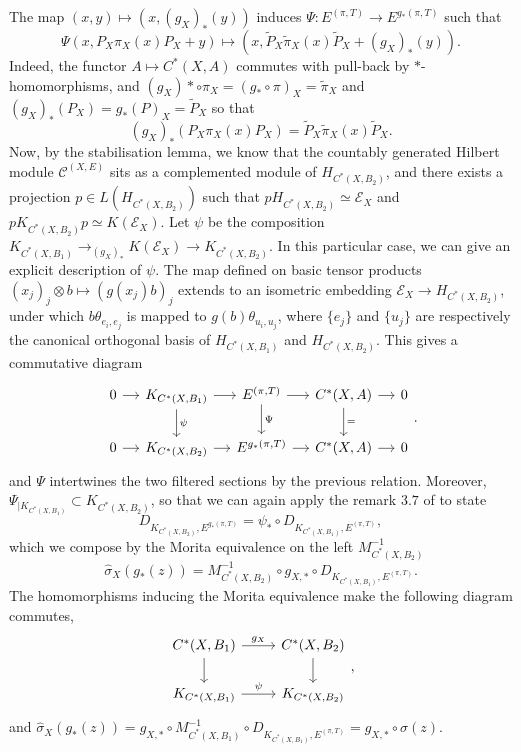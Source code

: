 \begin{dem}
\begin{enumerate}
The map $(x,y)\mapsto (x, (g_X)_*(y))$ induces $\Psi :E^{(\pi,T)}\rightarrow  E^{g_*(\pi,T)} $ such that
\[\Psi(x,P_X \pi_X(x) P_X +y)\mapsto (x,\tilde P_X \tilde\pi_X(x) \tilde P_X+(g_X)_*(y)).\]
Indeed, the functor $A\mapsto C^*(X,A)$ commutes with pull-back by $*$-homomorphisms, and $(g_X)*\circ\pi_X=(g_*\circ\pi)_X=\tilde \pi_X$ and $(g_X)_*(P_X) = g_*(P)_X=\tilde P_X$ so that 
\[(g_X)_*(P_X \pi_X(x) P_X)=\tilde P_X \tilde\pi_X(x) \tilde P_X. \]
Now, by the stabilisation lemma, we know that the countably generated Hilbert module $\mathcal C^(X,E)$ sits as a complemented module of $H_{C^*(X,B_2)}$, and there exists a projection $p\in L(H_{C^*(X,B_2)})$ such that $pH_{C^*(X,B_2)}\simeq \mathcal E_X$ and $pK_{C^*(X,B_2)}p\simeq K(\mathcal E_X)$. Let $\psi$ be the composition $K_{C^*(X,B_1)}\rightarrow_{(g_X)_*} K(\mathcal E_X)\rightarrow K_{C^*(X,B_2)}$. In this particular case, we can give an explicit description of $\psi$. The map defined on basic tensor products $(x_j)_{j}\otimes b\mapsto (g(x_j)b)_j $ extends to an isometric embedding $\mathcal E_X \rightarrow H_{C^*(X,B_2)}$, under which $ b\theta_{e_i,e_j}$ is mapped to $g(b)\theta_{u_i,u_j}$, where $\{e_j\}$ and $\{u_j\}$ are respectively the canonical orthogonal basis of $H_{C^*(X,B_1)}$ and $H_{C^*(X,B_2)}$. This gives a commutative diagram 
\[\begin{tikzcd}[column sep = small]
0\arrow{r} & K_{C^*(X,B_1)}\arrow{r}\arrow{d}{\psi} & E^{(\pi,T)} \arrow{r}\arrow{d}{\Psi}& C^*(X,A)\arrow{r}\arrow{d}{=} & 0\\
0\arrow{r} & K_{C^*(X,B_2)}\arrow{r} & E^{g_*(\pi,T)} \arrow{r}& C^*(X,A)\arrow{r} & 0
\end{tikzcd}.\]
and $\Psi$ intertwines the two filtered sections by the previous relation. Moreover, $\Psi_{|K_{C^*(X,B_1)}}\subset K_{C^*(X,B_2)}$, so that we can again apply the remark $3.7$ of \cite{OY2} to state
\[ D_{K_{C^*(X,B_2)},E^{g_*(\pi,T)}}=\psi_*\circ D_{K_{C^*(X,B_1)},E^{(\pi,T)}},\]
which we compose by the Morita equivalence on the left $M_{C^*(X,B_2)}^{-1}$
\[\hat\sigma_X(g_*(z)) = M_{C^*(X,B_2)}^{-1}\circ g_{X,*}\circ D_{K_{C^*(X,B_1)},E^{(\pi,T)}}.\]
The homomorphisms inducing the Morita equivalence make the following diagram commutes,
\[\begin{tikzcd}C^*(X,B_1)\arrow{r}{g_X}\arrow{d} & C^*(X,B_2)\arrow{d} \\ K_{C^*(X,B_1)} \arrow{r}{\psi}& K_{C^*(X,B_2)}\end{tikzcd},\]
and $\hat\sigma_X(g_*(z))= g_{X,*}\circ M_{C^*(X,B_1)}^{-1}\circ D_{K_{C^*(X,B_1)},E^{(\pi,T)}}=g_{X,*}\circ \hat\sigma(z)$.\\

\end{enumerate}
\end{dem}
